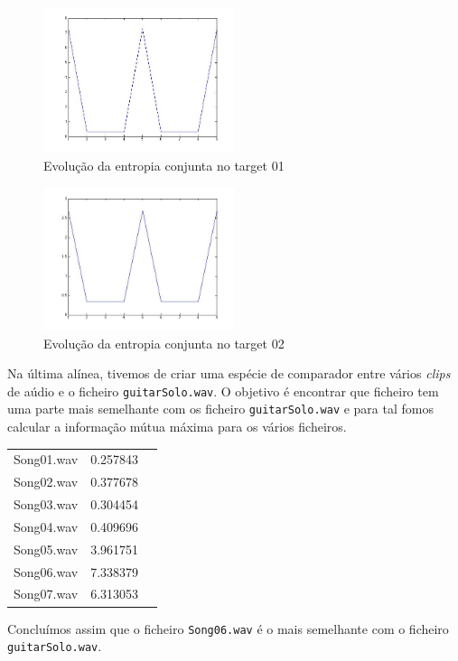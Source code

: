 \documentclass[12pt]{article}
\begin{document}
  \begin{figure}[H]
    \centering
    \includegraphics[width=0.5\textwidth]{ex6a}
    \caption{Evolução da entropia conjunta no target 01}
  \end{figure}

  \begin{figure}[H]
    \centering
    \includegraphics[width=0.5\textwidth]{ex6b}
    \caption{Evolução da entropia conjunta no target 02}
  \end{figure}

  Na última alínea, tivemos de criar uma espécie de comparador
  entre vários \textit{clips} de aúdio e o ficheiro \texttt{guitarSolo.wav}.
  O objetivo é encontrar que ficheiro tem uma parte mais semelhante com
  os ficheiro \texttt{guitarSolo.wav} e para tal fomos calcular a informação mútua
  máxima para os vários ficheiros.

  \begin{tabular}{ l c r }
    Song01.wav & 0.257843 \\
    Song02.wav & 0.377678 \\
    Song03.wav & 0.304454 \\
    Song04.wav & 0.409696 \\
    Song05.wav & 3.961751 \\
    Song06.wav & 7.338379 \\
    Song07.wav & 6.313053 \\
  \end{tabular}

  Concluímos assim que o ficheiro \texttt{Song06.wav} é o mais semelhante
  com o ficheiro \texttt{guitarSolo.wav}.
\end{document}
